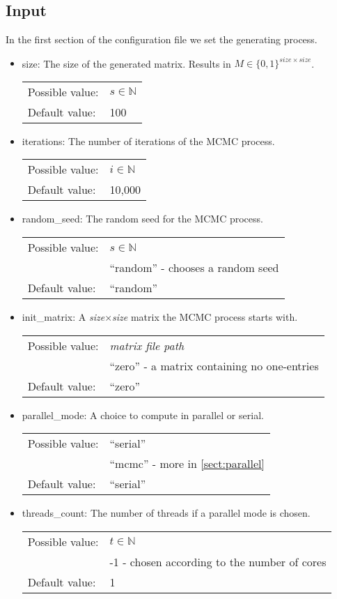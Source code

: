 \subsection{Input}
In the first section of the configuration file we set the generating process.
\begin{itemize}
\item size: The size of the generated matrix. Results in $M\in\{0,1\}^{size\times size}$.

\begin{tabular}{ll}
Possible value: & $s\in\mathbb{N}$ \\
Default value: & 100
\end{tabular}

\item iterations: The number of iterations of the MCMC process.

\begin{tabular}{ll}
Possible value: & $i\in\mathbb{N}$ \\
Default value: & 10,000
\end{tabular}

\item random\_seed: The random seed for the MCMC process.

\begin{tabular}{ll}
Possible value: & $s\in\mathbb{N}$ \\
& ``random'' - chooses a random seed \\
Default value: & ``random''
\end{tabular}

\item init\_matrix: A \textit{size}$\times$\textit{size} matrix the MCMC process starts with.

\begin{tabular}{ll}
Possible value: & \textit{matrix file path} \\
& ``zero'' - a matrix containing no one-entries \\
Default value: & ``zero''
\end{tabular}

\item parallel\_mode: A choice to compute in parallel or serial.

\begin{tabular}{ll}
Possible value: & ``serial'' \\
& ``mcmc'' - more in \autoref{sect:parallel} \\
Default value: & ``serial''
\end{tabular}

\item threads\_count: The number of threads if a parallel mode is chosen.

\begin{tabular}{ll}
Possible value: & $t\in\mathbb{N}$ \\
& -1 - chosen according to the number of cores \\
Default value: & 1
\end{tabular}
\end{itemize}

